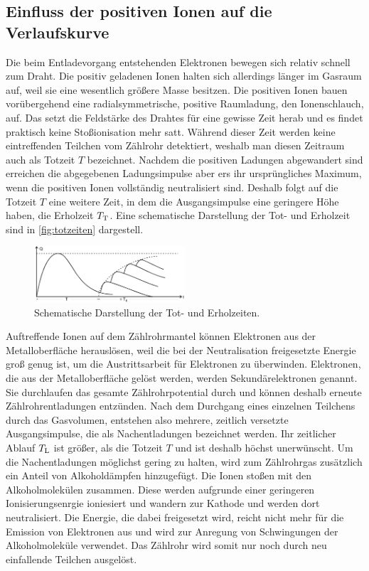 \subsection{Einfluss der positiven Ionen auf die Verlaufskurve}
\label{subsec:posIon}

Die beim Entladevorgang entstehenden Elektronen bewegen sich relativ schnell zum Draht. Die positiv geladenen Ionen halten sich allerdings länger im Gasraum auf, weil sie eine wesentlich größere Masse besitzen. Die positiven Ionen bauen vorübergehend
eine radialsymmetrische, positive Raumladung, den Ionenschlauch, auf. Das setzt die Feldstärke des Drahtes für eine gewisse Zeit herab und es findet praktisch keine Stoßionisation mehr satt. Während dieser Zeit werden keine eintreffenden Teilchen vom Zählrohr detektiert,
weshalb man diesen Zeitraum auch als Totzeit $T$ bezeichnet. Nachdem die positiven Ladungen abgewandert sind erreichen die abgegebenen Ladungsimpulse aber ers ihr ursprüngliches Maximum, wenn die positiven Ionen vollständig neutralisiert sind.
Deshalb folgt auf die Totzeit $T$ eine weitere Zeit, in dem die Ausgangsimpulse eine geringere Höhe haben, die Erholzeit $T_{\text T}$. Eine schematische Darstellung der Tot- und Erholzeit sind in \autoref{fig:totzeiten} dargestell.
\begin{figure}[H]
    \centering
    \includegraphics[width=0.5\textwidth]{data/totzeiten.png}
    \caption{Schematische Darstellung der Tot- und Erholzeiten.}
    \label{fig:totzeiten}
\end{figure}

Auftreffende Ionen auf dem Zählrohrmantel können Elektronen aus der Metalloberfläche herauslösen, weil die bei der Neutralisation freigesetzte Energie groß genug ist, um die Austrittsarbeit für Elektronen zu überwinden.
Elektronen, die aus der Metalloberfläche gelöst werden, werden Sekundärelektronen genannt. Sie durchlaufen das gesamte Zählrohrpotential durch und können deshalb erneute Zählrohrentladungen entzünden. Nach dem Durchgang eines einzelnen Teilchens 
durch das Gasvolumen, entstehen also mehrere, zeitlich versetzte Ausgangsimpulse, die als Nachentladungen bezeichnet werden. Ihr zeitlicher Ablauf $T_{\text L}$ ist größer, als die Totzeit $T$ und ist deshalb höchst unerwünscht.
Um die Nachentladungen möglichst gering zu halten, wird zum Zählrohrgas zusätzlich ein Anteil von Alkoholdämpfen hinzugefügt. Die Ionen stoßen mit den Alkoholmolekülen zusammen. Diese werden aufgrunde einer geringeren Ionisierungsenrgie ioniesiert und wandern zur Kathode und werden dort neutralisiert.
Die Energie, die dabei freigesetzt wird, reicht nicht mehr für die Emission von Elektronen aus und wird zur Anregung von Schwingungen der Alkoholmoleküle verwendet. Das Zählrohr wird somit nur noch durch neu einfallende Teilchen ausgelöst.

